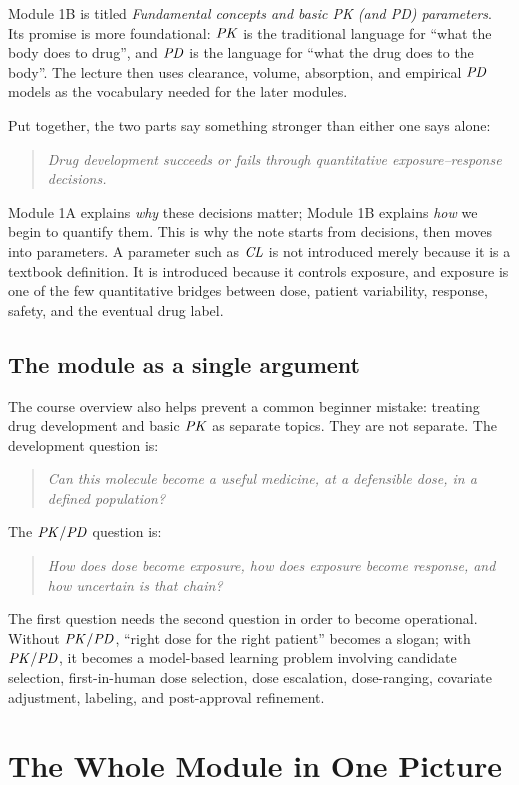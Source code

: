 \documentclass[a4paper]{article}
\newcommand{\CL}{\ensuremath{\pksym{CL}}}
\newcommand{\PK}{\ensuremath{\pksym{PK}}}
\newcommand{\PD}{\ensuremath{\pksym{PD}}}
\newcommand{\PKPD}{\ensuremath{\pksym{PK}/\pksym{PD}}}
\begin{document}
Module 1B is titled \emph{Fundamental concepts and basic PK (and PD) parameters}. Its promise is more foundational: \PK{} is the traditional language for ``what the body does to drug'', and \PD{} is the language for ``what the drug does to the body''. The lecture then uses clearance, volume, absorption, and empirical \PD{} models as the vocabulary needed for the later modules.

Put together, the two parts say something stronger than either one says alone:
\begin{quote}
\itshape
Drug development succeeds or fails through quantitative exposure--response decisions.
\end{quote}
Module 1A explains \emph{why} these decisions matter; Module 1B explains \emph{how} we begin to quantify them. This is why the note starts from decisions, then moves into parameters. A parameter such as \CL{} is not introduced merely because it is a textbook definition. It is introduced because it controls exposure, and exposure is one of the few quantitative bridges between dose, patient variability, response, safety, and the eventual drug label.

\subsection{The module as a single argument}

The course overview also helps prevent a common beginner mistake: treating drug development and basic \PK{} as separate topics. They are not separate. The development question is:
\begin{quote}
\itshape
Can this molecule become a useful medicine, at a defensible dose, in a defined population?
\end{quote}
The \PKPD{} question is:
\begin{quote}
\itshape
How does dose become exposure, how does exposure become response, and how uncertain is that chain?
\end{quote}
The first question needs the second question in order to become operational. Without \PKPD, ``right dose for the right patient'' becomes a slogan; with \PKPD, it becomes a model-based learning problem involving candidate selection, first-in-human dose selection, dose escalation, dose-ranging, covariate adjustment, labeling, and post-approval refinement.

\section{The Whole Module in One Picture}
\end{document}
